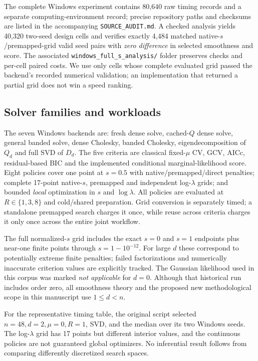 The complete Windows experiment contains 80,640 raw timing records
and a separate computing-environment record; precise repository paths and
checksums are listed in the accompanying \texttt{SOURCE\_AUDIT.md}. A checked analysis yields 40,320 two-seed design cells and verifies exactly 4,484 matched native-$s$/premapped-grid valid seed pairs with \emph{zero difference} in selected smoothness and score. The associated \texttt{windows\_full\_s\_analysis/} folder preserves checks and per-cell paired costs. We use only cells whose complete evaluated grid passed the backend's recorded numerical validation; an implementation that returned a partial grid does not win a speed ranking.

\subsection{Solver families and workloads}
The seven Windows backends are: fresh dense solve, cached-$Q$ dense solve, general banded solve, dense Cholesky, banded Cholesky, eigendecomposition of $Q_d$ and full SVD of $D_d$. The five criteria are classical fixed-$\mu$ CV, GCV, AICc, residual-based BIC and the implemented conditional marginal-likelihood score. Eight policies cover one point at $s=0.5$ with native/premapped/direct penalties; complete 17-point native-$s$, premapped and independent log-$\lambda$ grids; and bounded \emph{local} optimization in $s$ and $\log\lambda$. All policies are evaluated at $R\in\{1,3,8\}$ and cold/shared preparation. Grid conversion is separately timed; a standalone premapped search charges it once, while reuse across criteria charges it only once across the entire joint workflow.

The full normalized-$s$ grid includes the exact $s=0$ and $s=1$ endpoints plus near-one finite points through $s=1-10^{-12}$. For large $d$ these correspond to potentially extreme finite penalties; failed factorizations and numerically inaccurate criterion values are explicitly tracked. The Gaussian likelihood used in this corpus was marked \emph{not applicable} for $d=0$. Although that historical run includes order zero, all smoothness theory and the proposed new methodological scope in this manuscript use $1\le d<n$.

For the representative timing table, the original script selected $n=48,d=2,\mu=0,R=1$, SVD, and the median over its two Windows seeds. The log-$\lambda$ grid has 17 points but different interior values, and the continuous policies are not guaranteed global optimizers. No inferential result follows from comparing differently discretized search spaces.

